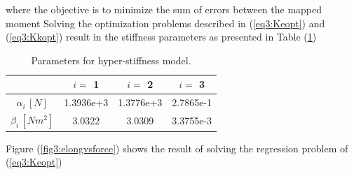 where the objective is to minimize the sum of errors between the mapped moment Solving the optimization problems described in (\ref{eq3:Keopt}) and (\ref{eq3:Kkopt}) result in the stiffness parameters as presented in Table (\ref{tab3:stiffnessparameters})

\begin{table}[H]
    \centering
        \caption{Parameters for hyper-stiffness model.}
\begin{tabular}{|c|c|c|c|} \hline
            &  $i = $ 1      &    $i = $    2   &  $i = $ 3  \\ \hline
   $\alpha_i \hspace{2pt}[N]$    &    1.3936e+3    & 1.3776e+3    & 2.7865e-1 \\ \hline
   $\beta_i \hspace{2pt}  [Nm^2] $     &  3.0322 & 3.0309    &  3.3755e-3\\ \hline
\end{tabular}
    \label{tab3:stiffnessparameters}
\end{table}

Figure (\ref{fig3:elongvsforce}) shows the result of solving the regression problem of (\ref{eq3:Keopt})


